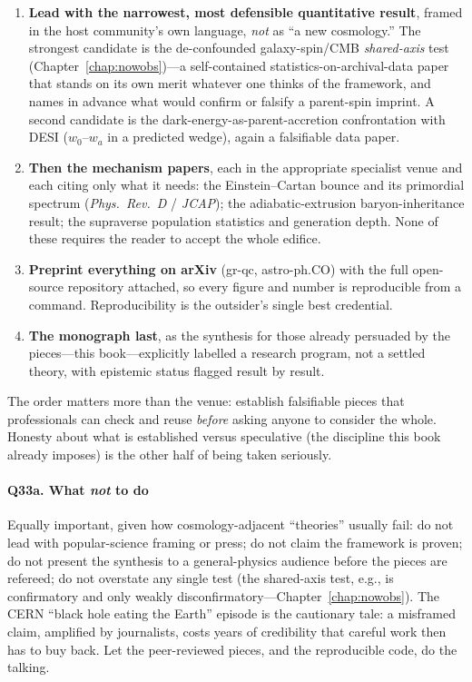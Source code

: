 \begin{enumerate}
  \item \textbf{Lead with the narrowest, most defensible quantitative result}, framed
    in the host community's own language, \emph{not} as ``a new cosmology.'' The
    strongest candidate is the de-confounded galaxy-spin/CMB \emph{shared-axis} test
    (Chapter~\ref{chap:nowobs})---a self-contained statistics-on-archival-data paper
    that stands on its own merit whatever one thinks of the framework, and names in
    advance what would confirm or falsify a parent-spin imprint. A second candidate is
    the dark-energy-as-parent-accretion confrontation with DESI ($w_0$--$w_a$ in a
    predicted wedge), again a falsifiable data paper.
  \item \textbf{Then the mechanism papers}, each in the appropriate specialist venue
    and each citing only what it needs: the Einstein--Cartan bounce and its primordial
    spectrum (\emph{Phys.\ Rev.\ D} / \emph{JCAP}); the adiabatic-extrusion
    baryon-inheritance result; the supraverse population statistics and generation
    depth. None of these requires the reader to accept the whole edifice.
  \item \textbf{Preprint everything on arXiv} (gr-qc, astro-ph.CO) with the full
    open-source repository attached, so every figure and number is reproducible from a
    command. Reproducibility is the outsider's single best credential.
  \item \textbf{The monograph last}, as the synthesis for those already persuaded by
    the pieces---this book---explicitly labelled a research program, not a settled
    theory, with epistemic status flagged result by result.
\end{enumerate}
The order matters more than the venue: establish falsifiable pieces that professionals
can check and reuse \emph{before} asking anyone to consider the whole. Honesty about
what is established versus speculative (the discipline this book already imposes) is
the other half of being taken seriously.

\paragraph{Q33a. What \emph{not} to do}
Equally important, given how cosmology-adjacent ``theories'' usually fail: do not lead
with popular-science framing or press; do not claim the framework is proven; do not
present the synthesis to a general-physics audience before the pieces are refereed; do
not overstate any single test (the shared-axis test, e.g., is confirmatory and only
weakly disconfirmatory---Chapter~\ref{chap:nowobs}). The CERN ``black hole eating the
Earth'' episode is the cautionary tale: a misframed claim, amplified by journalists,
costs years of credibility that careful work then has to buy back. Let the
peer-reviewed pieces, and the reproducible code, do the talking.

